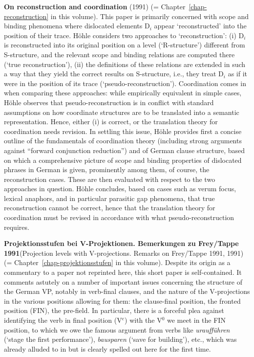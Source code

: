 \begin{refsection}
\textbf{On reconstruction and coordination} (1991) (= Chapter~\ref{chap-reconstruction} in this
volume). This paper is primarily concerned with scope and binding phenomena where dislocated
elements D$_i$ appear `reconstructed' into the position of their trace. Höhle considers two
approaches to `reconstruction': (i) D$_i$ is reconstructed into its original position on a level
(`R-structure') different from S-structure, and the relevant scope and binding relations are
computed there (`true reconstruction'), (ii) the definitions of these relations are extended in such
a way that they yield the correct results on S-structure, i.e., they treat D$_i$ as if it were in
the position of its trace (`pseudo-reconstruction'). Coordination comes in when comparing these
approaches: while empirically equivalent in simple cases, Höhle observes that pseudo-reconstruction
is in conflict with standard assumptions on how coordinate structures are to be translated into a
semantic representation. Hence, either (i) is correct, or the translation theory for coordination
needs revision. In settling this issue, Höhle provides first a concise outline of the fundamentals
of coordination theory (including strong arguments against ``forward conjunction reduction'') and of
German clause structure, based on which a comprehensive picture of scope and binding properties of
dislocated phrases in German is given, prominently among them, of course, the reconstruction
cases. These are then evaluated with respect to the two approaches in question. Höhle concludes,
based on cases such as verum focus, lexical anaphors, and in particular parasitic gap phenomena,
that true reconstruction cannot be correct, hence that the translation theory for coordination must
be revised in accordance with what pseudo-reconstruction requires.   

\textbf{Projektionsstufen bei V-Projektionen. Bemerkungen zu Frey/Tappe 1991}\linebreak (Projection levels with V-projections. Remarks on Frey/Tappe 1991, 1991) (=
Chapter~\ref{chap-projektionsstufen} in this volume). Despite its origin as a commentary to a paper
not reprinted here, this short paper is self-contained. It comments astutely on a number of
important issues concerning the structure of the German VP, notably in verb-final clauses, and the
nature of the V-projections in the various positions allowing for them: the clause-final position, the
fronted position (FIN), the pre-field. In particular, there is a forceful plea against identifying
the verb in final position (V$^e$) with the V$^0$ we meet in the FIN position, to which we owe the famous
argument from verbs like \emph{uraufführen} (`stage the first performance'), \emph{bausparen} (`save
for building'), etc., which was already alluded to in \citet[34]{Hoehle78a} but is clearly spelled out here for the first time. 


\end{refsection}
